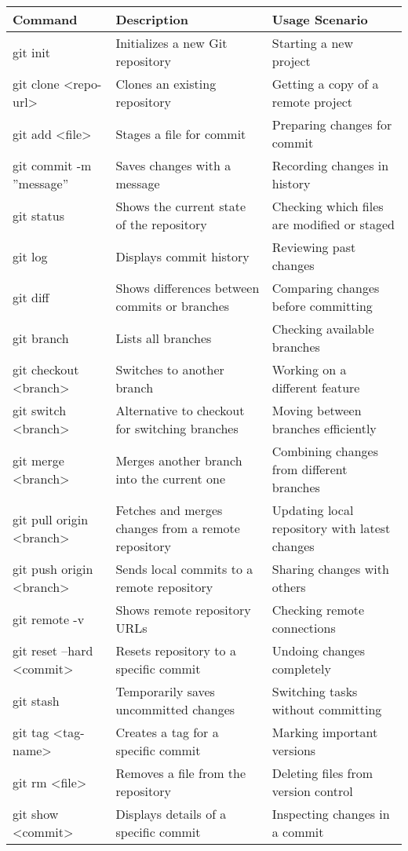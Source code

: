 \begin{longtable}{|l|p{6cm}|p{6cm}|}
    \hline
    \textbf{Command} & \textbf{Description} & \textbf{Usage Scenario} \\
    \hline
    \endhead
    git init & Initializes a new Git repository & Starting a new project \\
    \hline
    git clone \textless repo-url\textgreater & Clones an existing repository & Getting a copy of a remote project \\
    \hline
    git add \textless file\textgreater & Stages a file for commit & Preparing changes for commit \\
    \hline
    git commit -m ''message'' & Saves changes with a message & Recording changes in history \\
    \hline
    git status & Shows the current state of the repository & Checking which files are modified or staged \\
    \hline
    git log & Displays commit history & Reviewing past changes \\
    \hline
    git diff & Shows differences between commits or branches & Comparing changes before committing \\
    \hline
    git branch & Lists all branches & Checking available branches \\
    \hline
    git checkout \textless branch\textgreater & Switches to another branch & Working on a different feature \\
    \hline
    git switch \textless branch\textgreater & Alternative to checkout for switching branches & Moving between branches efficiently \\
    \hline
    git merge \textless branch\textgreater & Merges another branch into the current one & Combining changes from different branches \\
    \hline
    git pull origin \textless branch\textgreater & Fetches and merges changes from a remote repository & Updating local repository with latest changes \\
    \hline
    git push origin \textless branch\textgreater & Sends local commits to a remote repository & Sharing changes with others \\
    \hline
    git remote -v & Shows remote repository URLs & Checking remote connections \\
    \hline
    git reset --hard \textless commit\textgreater & Resets repository to a specific commit & Undoing changes completely \\
    \hline
    git stash & Temporarily saves uncommitted changes & Switching tasks without committing \\
    \hline
    git tag \textless tag-name\textgreater & Creates a tag for a specific commit & Marking important versions \\
    \hline
    git rm \textless file\textgreater & Removes a file from the repository & Deleting files from version control \\
    \hline
    git show \textless commit\textgreater & Displays details of a specific commit & Inspecting changes in a commit \\
    \hline
\end{longtable}

